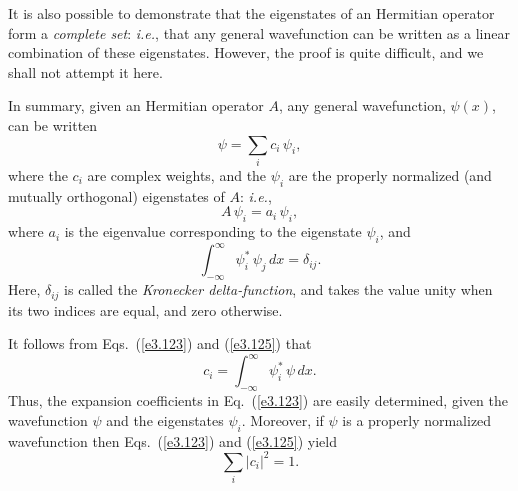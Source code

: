 It is also possible to demonstrate that the eigenstates of an
Hermitian operator form a {\em complete set}: {\em i.e.}, that any
general wavefunction can be written as a linear combination
of these eigenstates. However, the proof is quite difficult, and
we shall not attempt it here. 

In summary, given an Hermitian
operator $A$, any general wavefunction, $\psi(x)$, can be written
\begin{equation}\label{e3.123}
\psi = \sum_{i}c_i\,\psi_i,
\end{equation}
where the $c_i$ are complex weights, and the $\psi_i$ are the properly
normalized (and mutually orthogonal) eigenstates of $A$: {\em i.e.}, 
\begin{equation}
A\,\psi_i = a_i\,\psi_i,
\end{equation}
where $a_i$ is the eigenvalue corresponding to the eigenstate $\psi_i$,
and
\begin{equation}\label{e3.125}
\int_{-\infty}^\infty \psi_i^\ast\,\psi_j \,dx = \delta_{ij}.
\end{equation}
Here, $\delta_{ij}$ is called the {\em Kronecker delta-function}, and
takes the value unity when its two indices are equal, and zero otherwise.

It follows from Eqs.~(\ref{e3.123}) and (\ref{e3.125})
that
\begin{equation}\label{e3.126}
c_i = \int_{-\infty}^\infty \psi_i^\ast\,\psi\,dx.
\end{equation}
Thus, the expansion coefficients in Eq.~(\ref{e3.123}) are easily determined,
given the wavefunction $\psi$ and the eigenstates $\psi_i$. 
Moreover, if $\psi$ is a properly normalized wavefunction then Eqs.~(\ref{e3.123}) and (\ref{e3.125})
yield
\begin{equation}\label{e3.127}
\sum_i |c_i|^2 =1.
\end{equation}

